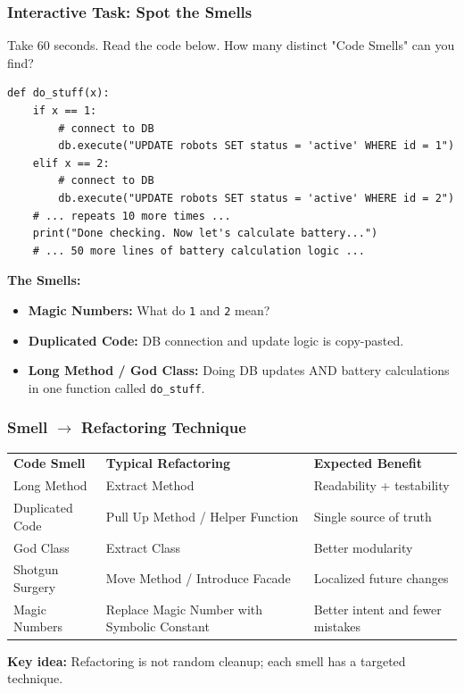 \documentclass[xcolor=table]{beamer}
\begin{document}
\begin{frame}[fragile]
    \frametitle{Interactive Task: Spot the Smells}
    \small
    Take 60 seconds. Read the code below. How many distinct "Code Smells" can you find?
    
    \begin{verbatim}
def do_stuff(x):
    if x == 1:
        # connect to DB
        db.execute("UPDATE robots SET status = 'active' WHERE id = 1")
    elif x == 2:
        # connect to DB
        db.execute("UPDATE robots SET status = 'active' WHERE id = 2")
    # ... repeats 10 more times ...
    print("Done checking. Now let's calculate battery...")
    # ... 50 more lines of battery calculation logic ...
    \end{verbatim}
    
    \pause
    \vspace{0.2cm}
    \textbf{The Smells:}
    \begin{itemize}
        \item \textbf{Magic Numbers:} What do \texttt{1} and \texttt{2} mean?
        \item \textbf{Duplicated Code:} DB connection and update logic is copy-pasted.
        \item \textbf{Long Method / God Class:} Doing DB updates AND battery calculations in one function called \texttt{do\_stuff}.
    \end{itemize}
\end{frame}

\begin{frame}
    \frametitle{Smell $\rightarrow$ Refactoring Technique}
    \small
    \begin{center}
    \begin{tabular}{p{} p{} p{}}
        \rowcolor{blue!20}
        \textbf{Code Smell} & \textbf{Typical Refactoring} & \textbf{Expected Benefit} \\
        Long Method & Extract Method & Readability + testability \\
        Duplicated Code & Pull Up Method / Helper Function & Single source of truth \\
        God Class & Extract Class & Better modularity \\
        Shotgun Surgery & Move Method / Introduce Facade & Localized future changes \\
        Magic Numbers & Replace Magic Number with Symbolic Constant & Better intent and fewer mistakes \\
    \end{tabular}
    \end{center}

    \vspace{0.2cm}
    \textbf{Key idea:} Refactoring is not random cleanup; each smell has a targeted technique.
\end{frame}
\end{document}
